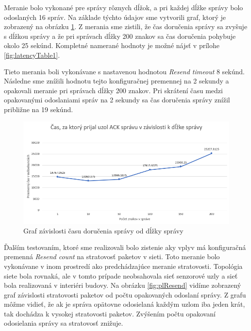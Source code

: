 \documentclass[slovak,master]{diploma}
\begin{document}
Meranie bolo vykonané pre správy rôznych dĺžok, a pri každej dĺžke správy bolo odoslaných 16 správ. Na základe týchto údajov sme vytvorili graf, ktorý je 
zobrazený na obrázku \ref{fig:latencyGraph}. Z merania sme zistili, že čas doručenia správy sa zvyšuje s dĺžkou správy a že pri správach dĺžky 200 znakov sa čas doručenia 
pohybuje okolo 25 sekúnd. Kompletné namerané hodnoty je možné nájsť v prílohe \ref{fig:latencyTable1}.

Tieto merania boli vykonávane s nastavenou hodnotou \emph{Resend timeout} 8 sekúnd. Následne sme znížili hodnotu tejto konfiguračnej premennej na 2 sekundy 
a opakovali meranie pri správach dĺžky 200 znakov. Pri skrátení času medzi opakovanými odoslaniami správ na 2 sekundy sa čas doručenia správy znížil približne 
na 19 sekúnd. 
\begin{figure}[h!]
  \centering
  \includegraphics[width=1\textwidth]{Figures/latencyGraph.png}
  \caption{Graf závislosti času doručenia správy od dĺžky správy}
  \label{fig:latencyGraph}
\end{figure}

Ďalším testovaním, ktoré sme realizovali bolo zistenie aky vplyv má konfiguračná premenná \emph{Resend count} na stratovosť paketov v sieti. Toto meranie bolo vykonávane 
v inom prostredí ako predchádzajúce meranie stratovosti. Topológia siete bola rovnaká, ale v tomto prípade neobsahovala sieť senzorové uzly a sieť bola realizovaná v 
interiéri budovy. Na obrázku \ref{fig:plResend} vidíme zobrazený graf závislosti stratovosti paketov od počtu opakovaných odoslaní správy. Z grafu môžme vidieť, že ak 
je správa opätovne odosielaná každým uzlom iba jeden krát, tak dochádza k vysokej stratovosti paketov. Zvýšením počtu opakovaní odosielania správy sa stratovosť 
znižuje.
\end{document}
